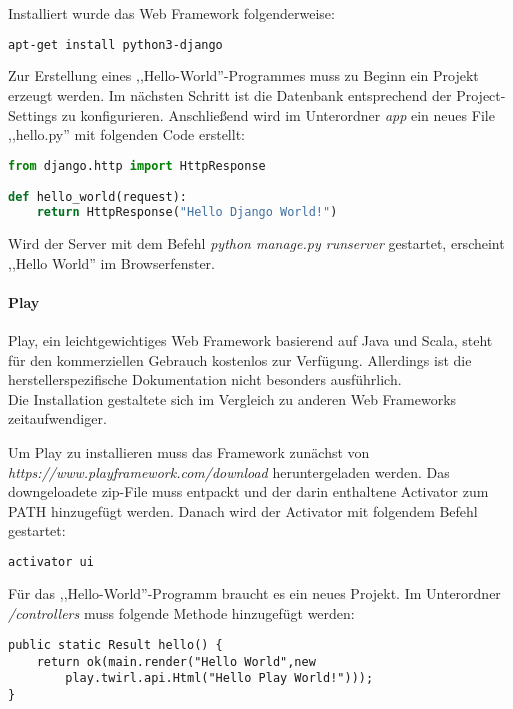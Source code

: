 Installiert wurde das Web Framework folgenderweise:
\begin{lstlisting}[caption={Installation von Django\cite{DJANGOIN}}, language=bash]
apt-get install python3-django
\end{lstlisting}

\newpage

Zur Erstellung eines ,,Hello-World''-Programmes muss zu Beginn ein Projekt erzeugt werden. Im nächsten Schritt ist die Datenbank entsprechend der Project-Settings zu konfigurieren. Anschließend wird im Unterordner \textit{app} ein neues File ,,hello.py'' mit folgenden Code erstellt:

\begin{lstlisting}[caption={Django Hello-World \cite{DJANGOCODE}}, language=Python]
from django.http import HttpResponse

def hello_world(request):
	return HttpResponse("Hello Django World!")
\end{lstlisting}

Wird der Server mit dem Befehl \textit{python manage.py runserver} gestartet, erscheint ,,Hello World'' im Browserfenster.

\paragraph{Play}
Play, ein leichtgewichtiges Web Framework basierend auf Java und Scala, steht für den kommerziellen Gebrauch kostenlos zur Verfügung. Allerdings ist die herstellerspezifische Dokumentation nicht besonders ausführlich.\\
Die Installation gestaltete sich im Vergleich zu anderen Web Frameworks zeitaufwendiger. \cite{PLAY}

Um Play zu installieren muss das Framework zunächst von
\textit{https://www.playframework.com/download} heruntergeladen werden. Das downgeloadete zip-File muss entpackt und der darin enthaltene Activator zum PATH hinzugefügt werden. Danach wird der Activator mit folgendem Befehl gestartet\cite{PLAYCON}:
\begin{lstlisting}[caption={Konfiguration von Play \cite{PLAYCON}}, language=bash]
activator ui
\end{lstlisting}

Für das ,,Hello-World''-Programm braucht es ein neues Projekt. Im Unterordner \textit{/controllers} muss folgende Methode hinzugefügt werden:

\begin{lstlisting}[caption={Play Hello-World \cite{PLAYCON}}]
public static Result hello() {
	return ok(main.render("Hello World",new
		play.twirl.api.Html("Hello Play World!")));
}
\end{lstlisting}

